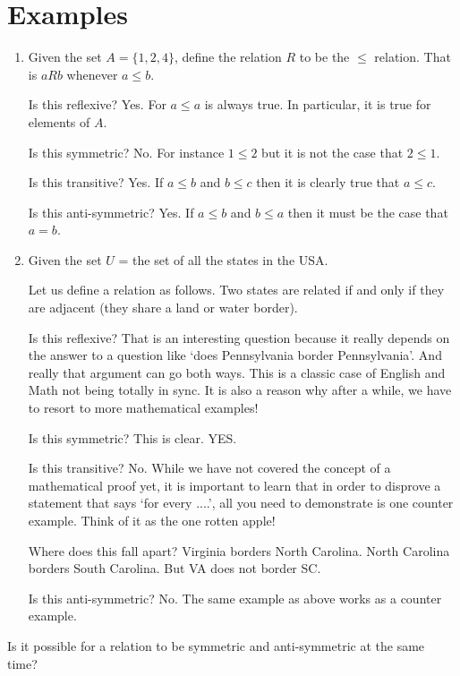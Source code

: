 \documentclass[12pt]{article}
\begin{document}
\section*{Examples}
\begin{enumerate}
\item Given the set $A = \{1, 2, 4\}$, define the relation $R$ to be the $\le$ relation. That is $aRb$ whenever $a \le b$.

Is this reflexive?  Yes. For $a \le a$ is always true. In particular, it is true for elements of $A$.

Is this symmetric? No. For instance $1 \le 2$ but it is not the case that $2 \le 1$.

Is this transitive? Yes. If $a \le b$ and $ b \le c$ then it is clearly true that $a \le c$.

Is this anti-symmetric? Yes. If $a \le b$ and $b \le a$ then it must be the case that $a = b$.

\item Given the set $U$ = the set of all the states in the USA. 

Let us define a relation as follows. Two states are related if and only if they are adjacent (they share a land or water border). 

Is this reflexive? That is an interesting question because it really depends on the answer to a question like `does Pennsylvania border Pennsylvania'. And really that argument can go both ways. This is a classic case of English and Math not being totally in sync. It is also a reason why after a while, we have to resort to more mathematical examples!

Is this symmetric? This is clear. YES. 

Is this transitive? No. While we have not covered the concept of a mathematical proof yet, it is important to learn that in order to disprove a statement that says `for every ....', all you need to demonstrate is one counter example. Think of it as the one rotten apple!

Where does this fall apart? Virginia borders North Carolina. North Carolina borders South Carolina. But VA does not border SC. 

Is this anti-symmetric? No. The same example as above works as a counter example. 

\end{enumerate}

\medskip

Is it possible for a relation to be symmetric and anti-symmetric at the same time?
\end{document}
